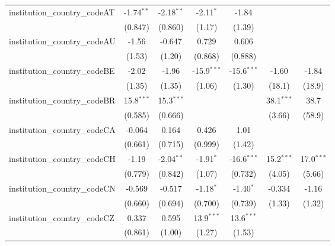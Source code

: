 \begin{tabular}{lcccccc}
   institution\_country\_codeAT          & -1.74$^{**}$  & -2.18$^{**}$  & -2.11$^{*}$   & -1.84         &               &   \\   
                                         & (0.847)       & (0.860)       & (1.17)        & (1.39)        &               &   \\   
   institution\_country\_codeAU          & -1.56         & -0.647        & 0.729         & 0.606         &               &   \\   
                                         & (1.53)        & (1.20)        & (0.868)       & (0.888)       &               &   \\   
   institution\_country\_codeBE          & -2.02         & -1.96         & -15.9$^{***}$ & -15.6$^{***}$ & -1.60         & -1.84\\   
                                         & (1.35)        & (1.35)        & (1.06)        & (1.30)        & (18.1)        & (18.9)\\   
   institution\_country\_codeBR          & 15.8$^{***}$  & 15.3$^{***}$  &               &               & 38.1$^{***}$  & 38.7\\   
                                         & (0.585)       & (0.666)       &               &               & (3.66)        & (58.9)\\   
   institution\_country\_codeCA          & -0.064        & 0.164         & 0.426         & 1.01          &               &   \\   
                                         & (0.661)       & (0.715)       & (0.999)       & (1.42)        &               &   \\   
   institution\_country\_codeCH          & -1.19         & -2.04$^{**}$  & -1.91$^{*}$   & -16.6$^{***}$ & 15.2$^{***}$  & 17.0$^{***}$\\   
                                         & (0.779)       & (0.842)       & (1.07)        & (0.732)       & (4.05)        & (5.66)\\   
   institution\_country\_codeCN          & -0.569        & -0.517        & -1.18$^{*}$   & -1.40$^{*}$   & -0.334        & -1.16\\   
                                         & (0.660)       & (0.694)       & (0.700)       & (0.739)       & (1.33)        & (1.32)\\   
   institution\_country\_codeCZ          & 0.337         & 0.595         & 13.9$^{***}$  & 13.6$^{***}$  &               &   \\   
                                         & (0.861)       & (1.00)        & (1.27)        & (1.53)        &               &   \\   

\end{tabular}
